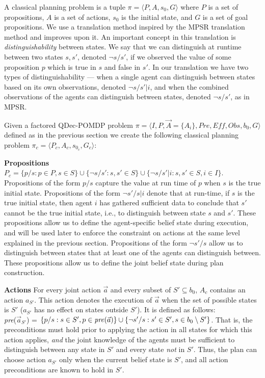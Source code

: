 \documentclass[letterpaper]{article}
\newcommand{\set}[1]{\{#1\}}
\theoremstyle{definition}
\begin{document}
A classical planning problem is a tuple $\pi=\langle P,A,s_0,G\rangle$ where $P$ is a set of propositions, $A$ is a set of actions, $s_0$ is the initial state, and $G$ is a set of goal propositions. We use a translation method inspired by the MPSR translation method \cite{MPSR} and improves upon it. An important concept in this translation is {\em distinguishability} between states. We say that we can distinguish at runtime between two states $s,s'$, denoted $\neg s/s'$, if we observed the value of some proposition $p$ which is true in $s$ and false in $s'$. In our translation we have two types of distinguishability --- when a single agent can distinguish between states based on its own observations, denoted $\neg s/s'|i$, and when the combined observations of the agents can distinguish between states, denoted $\neg s/s'$, as in MPSR.

Given a factored QDec-POMDP problem $\pi=\langle  I,P,\vec{A}=\{A_i\},\mathit{Pre},\mathit{Eff},\mathit{Obs},b_0,G\rangle$ defined as in the previous section we create the following classical planning problem $\pi_c=\langle P_c,A_c,s_{0_c},G_c\rangle$:

{\bf Propositions} $P_c = \set{p/s : p\in P , s\in S}\cup\set{\neg s/s' : s,s'\in S}\cup\set{\neg s/s'|i : s,s'\in S, i \in I}.$
Propositions of the form $p/s$ capture the value at run time of $p$ when $s$ is the true initial state.
Propositions of the form $\neg s'/s|i$ denote that at run-time, if $s$ is the true
initial state, then agent $i$ has gathered sufficient data to conclude that $s'$ cannot be the true initial state, i.e., to distinguish between state $s$ and $s'$. These propositions allow us to define the agent-specific belief state during execution, and will be used later to enforce the constraint on actions at the same level explained in the previous section.
Propositions of the form $\neg s'/s$ allow us to distinguish between states that at least one of the agents can distinguish between. These propositions allow us to define the joint belief state during plan construction.

{\bf Actions} For every joint action $\vec{a}$ and every subset of $S'\subseteq b_0$, $A_c$ contains an action $a_{S'}$. This action
denotes the execution of $\vec{a}$ when the set of possible states is $S'$ ($a_{S'}$ has no effect on states outside $S'$). It is defined as follows:\\
 \emph{pre}($\vec{a}_{S'}$) =  $\{p/s : s \in S', p\in \mbox{\emph{pre}}(\vec{a})\} \cup\{\neg s'/s : s' \in S', s \in b_0\setminus S'\}$. That is, the preconditions must hold prior to applying the action in all states for which this action applies, {\em and} the joint knowledge of the agents must be sufficient to distinguish between any state in $S'$ and every state {\em not} in $S'$. Thus, the plan can choose action $a_{S'}$ only when the current belief state is $S'$, and all action preconditions are known to hold in $S'$.
\end{document}
